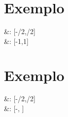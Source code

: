 \begin{multicols}{2}
\begin{minipage}{\linewidth}
\end{minipage}

\vspace{5mm}

\noindent%
\begin{minipage}{\linewidth}

\section{Exemplo}

\begin{BM}
	\sin&: [-\pi/2,\pi/2]\to[-1,1]
\\	\arcsin&: [-1,1]\to[-\pi/2,\pi/2]
\end{BM}


\end{minipage}

\vspace{5mm}

\noindent%
\begin{minipage}{\linewidth}

\section{Exemplo}

\begin{BM}
	\tan&: [-\pi/2,\pi/2]\to[-\infty, \infty]
\\	\arctan&: [-\infty, \infty]\to[-\pi/2,\pi/2]
\end{BM}


\end{minipage}

\end{multicols}